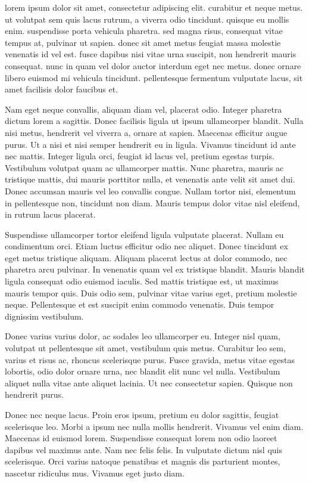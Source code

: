 \MakeLowercase{Lorem ipsum dolor sit amet, consectetur adipiscing elit. Curabitur et neque metus. Ut volutpat sem quis lacus rutrum, a viverra odio tincidunt. Quisque eu mollis enim. Suspendisse porta vehicula pharetra. Sed magna risus, consequat vitae tempus at, pulvinar ut sapien. Donec sit amet metus feugiat massa molestie venenatis id vel est. Fusce dapibus nisi vitae urna suscipit, non hendrerit mauris consequat. Nunc in quam vel dolor auctor interdum eget nec metus. Donec ornare libero euismod mi vehicula tincidunt. Pellentesque fermentum vulputate lacus, sit amet facilisis dolor faucibus et.}

Nam eget neque convallis, aliquam diam vel, placerat odio. Integer pharetra dictum lorem a sagittis. Donec facilisis ligula ut ipsum ullamcorper blandit. Nulla nisi metus, hendrerit vel viverra a, ornare at sapien. Maecenas efficitur augue purus. Ut a nisi et nisi semper hendrerit eu in ligula. Vivamus tincidunt id ante nec mattis. Integer ligula orci, feugiat id lacus vel, pretium egestas turpis. Vestibulum volutpat quam ac ullamcorper mattis. Nunc pharetra, mauris ac tristique mattis, dui mauris porttitor nulla, et venenatis ante velit sit amet dui. Donec accumsan mauris vel leo convallis congue. Nullam tortor nisi, elementum in pellentesque non, tincidunt non diam. Mauris tempus dolor vitae nisl eleifend, in rutrum lacus placerat.

Suspendisse ullamcorper tortor eleifend ligula vulputate placerat. Nullam eu condimentum orci. Etiam luctus efficitur odio nec aliquet. Donec tincidunt ex eget metus tristique aliquam. Aliquam placerat lectus at dolor commodo, nec pharetra arcu pulvinar. In venenatis quam vel ex tristique blandit. Mauris blandit ligula consequat odio euismod iaculis. Sed mattis tristique est, ut maximus mauris tempor quis. Duis odio sem, pulvinar vitae varius eget, pretium molestie neque. Pellentesque et est suscipit enim commodo venenatis. Duis tempor dignissim vestibulum.

Donec varius varius dolor, ac sodales leo ullamcorper eu. Integer nisl quam, volutpat ut pellentesque sit amet, vestibulum quis metus. Curabitur leo sem, varius et risus ac, rhoncus scelerisque purus. Fusce gravida, metus vitae egestas lobortis, odio dolor ornare urna, nec blandit elit nunc vel nulla. Vestibulum aliquet nulla vitae ante aliquet lacinia. Ut nec consectetur sapien. Quisque non hendrerit purus.

Donec nec neque lacus. Proin eros ipsum, pretium eu dolor sagittis, feugiat scelerisque leo. Morbi a ipsum nec nulla mollis hendrerit. Vivamus vel enim diam. Maecenas id euismod lorem. Suspendisse consequat lorem non odio laoreet dapibus vel maximus ante. Nam nec felis felis. In vulputate dictum nisl quis scelerisque. Orci varius natoque penatibus et magnis dis parturient montes, nascetur ridiculus mus. Vivamus eget justo diam.

